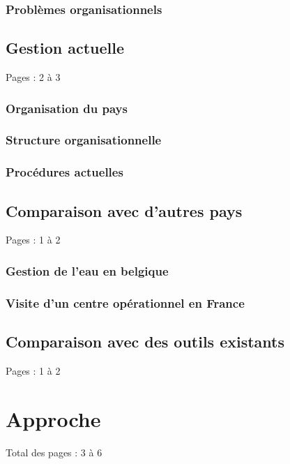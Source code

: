 \documentclass{eplmastersthesis_FR}
\begin{document}
			\subsection*{Problèmes organisationnels}

		\section{Gestion actuelle}

			Pages : 2 à 3

			\subsection*{Organisation du pays}
			\subsection*{Structure organisationnelle}
			\subsection*{Procédures actuelles}

		\section{Comparaison avec d'autres pays}

			Pages : 1 à 2

			\subsection*{Gestion de l'eau en belgique}
			\subsection*{Visite d'un centre opérationnel en France}

		\section{Comparaison avec des outils existants}

			Pages : 1 à 2



	\chapter{Approche}

		Total des pages : 3 à 6
\end{document}
